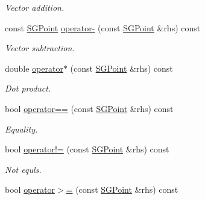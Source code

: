\begin{DoxyCompactItemize}
\begin{DoxyCompactList}\small\item\em Vector addition. \end{DoxyCompactList}\item 
\hypertarget{classSGPoint_a92c8c0ff9e9ec2946d9a42dbc4767940}{const \hyperlink{classSGPoint}{S\-G\-Point} \hyperlink{classSGPoint_a92c8c0ff9e9ec2946d9a42dbc4767940}{operator-\/} (const \hyperlink{classSGPoint}{S\-G\-Point} \&rhs) const }\label{classSGPoint_a92c8c0ff9e9ec2946d9a42dbc4767940}

\begin{DoxyCompactList}\small\item\em Vector subtraction. \end{DoxyCompactList}\item 
\hypertarget{classSGPoint_a4d2ced64673970ebfdf0bc55e1cfac9d}{double \hyperlink{classSGPoint_a4d2ced64673970ebfdf0bc55e1cfac9d}{operator$\ast$} (const \hyperlink{classSGPoint}{S\-G\-Point} \&rhs) const }\label{classSGPoint_a4d2ced64673970ebfdf0bc55e1cfac9d}

\begin{DoxyCompactList}\small\item\em Dot product. \end{DoxyCompactList}\item 
\hypertarget{classSGPoint_ab3d2eb16f79a746cce7763a4bf0938d1}{bool \hyperlink{classSGPoint_ab3d2eb16f79a746cce7763a4bf0938d1}{operator==} (const \hyperlink{classSGPoint}{S\-G\-Point} \&rhs) const }\label{classSGPoint_ab3d2eb16f79a746cce7763a4bf0938d1}

\begin{DoxyCompactList}\small\item\em Equality. \end{DoxyCompactList}\item 
\hypertarget{classSGPoint_ac548c65149f9d5e96bfed01e2a4acaa6}{bool \hyperlink{classSGPoint_ac548c65149f9d5e96bfed01e2a4acaa6}{operator!=} (const \hyperlink{classSGPoint}{S\-G\-Point} \&rhs) const }\label{classSGPoint_ac548c65149f9d5e96bfed01e2a4acaa6}

\begin{DoxyCompactList}\small\item\em Not equls. \end{DoxyCompactList}\item 
\hypertarget{classSGPoint_a217bb7b589615b96714b4ace0794368b}{bool \hyperlink{classSGPoint_a217bb7b589615b96714b4ace0794368b}{operator$>$=} (const \hyperlink{classSGPoint}{S\-G\-Point} \&rhs) const }\label{classSGPoint_a217bb7b589615b96714b4ace0794368b}


\end{DoxyCompactItemize}
